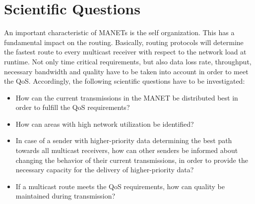 \documentclass[runningheads]{llncs}
\newcommand{\MANET}{MANET}
\newcommand{\QOS}{QoS}
\begin{document}
	\section{Scientific Questions}
	An important characteristic of \MANET{s} is the self organization. This has a fundamental impact on the routing. Basically, routing protocols will determine the fastest route to every multicast receiver with respect to the network load at runtime. Not only time critical requirements, but also data loss rate, throughput, necessary bandwidth and quality have to be taken into account in order to meet the \QOS{}. Accordingly, the following scientific questions have to be investigated:
	\begin{itemize}
		\item How can the current transmissions in the \MANET{} be distributed best in order to fulfill the \QOS{} requirements? 
		\item How can areas with high network utilization be identified?
		\item In case of a sender with higher-priority data determining the best path towards all multicast receivers, how can other senders be informed about changing the behavior of their current transmissions, in order to provide the necessary capacity for the delivery of higher-priority data?
		\item If a multicast route meets the \QOS{} requirements, how can quality be maintained during transmission?
	\end{itemize}
\end{document}
